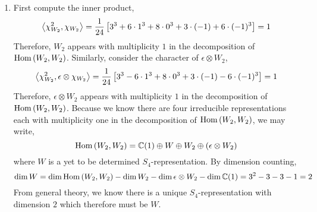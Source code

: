 \documentclass[12pt]{extarticle}
\begin{document}
\begin{enumerate}
\item First compute the inner product,
\begin{align*}
\left< \chi_{W_2}^2, \chi_{W_2} \right> = \frac{1}{24} \left[ 3^3 + 6 \cdot 1^3 + 8 \cdot 0^3 + 3 \cdot (-1) + 6 \cdot (-1)^3 \right] = 1
\end{align*}
Therefore, $W_2$ appears with multiplicity $1$ in the decomposition of $\mathrm{Hom}\left( W_2, W_2 \right)$. Similarly, consider the character of $\epsilon \otimes W_2$,
\begin{align*}
\left< \chi_{W_2}^2, \epsilon \otimes \chi_{W_2} \right> = \frac{1}{24} \left[ 3^3 - 6 \cdot 1^3 + 8 \cdot 0^3 + 3 \cdot (-1) - 6 \cdot (-1)^3 \right] = 1
\end{align*}
Therefore, $\epsilon \otimes W_2$ appears with multiplicity $1$ in the decomposition of $\mathrm{Hom}\left( W_2, W_2 \right)$. Because we know there are four irreducible representations each with multiplicity one in the decomposition of $\mathrm{Hom}\left( W_2, W_2 \right)$, we may write,
\[ \mathrm{Hom}\left( W_2, W_2 \right) = \mathbb{C}(1) \oplus W \oplus W_2 \oplus (\epsilon \otimes W_2) \]
where $W$ is a yet to be determined $S_4$-representation. By dimension counting, 
\[\dim{W} = \dim{\mathrm{Hom}\left( W_2, W_2 \right)} - \dim{W_2} - \dim{\epsilon \otimes W_2} - \dim{\mathbb{C}(1)} = 3^2 - 3 - 3 - 1 = 2\]
From general theory, we know there is a unique $S_4$-representation with dimension $2$ which therefore must be $W$. 

\end{enumerate}
\end{document}
